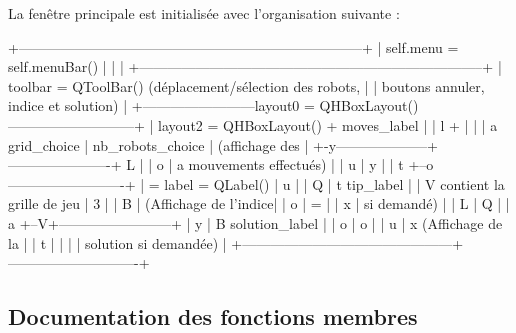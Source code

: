 \begin{DoxyVerb}La fenêtre principale est initialisée avec l'organisation suivante :

+--------------------------------------------------------------------------+
|              self.menu = self.menuBar()                                  |
|                                                                          |
+--------------------------------------------------------------------------+
|       toolbar = QToolBar()  (déplacement/sélection des robots,           |
|                     boutons annuler, indice et solution)                 |
+------------------------layout0 = QHBoxLayout()---------------------------+
|    layout2 = QHBoxLayout()                  +      moves_label           |
| l                    +                      |                            |
| a  grid_choice       |  nb_robots_choice    |     (affichage des         |
+-y--------------------+----------------------+  L                         |
| o                                           |  a  mouvements effectués)  |
| u                                           |  y                         |
| t                                           +--o-------------------------+
| =          label = QLabel()                 |  u                         |
| Q                                           |  t     tip_label           |
| V          contient la grille de jeu        |  3                         |
| B                                           |      (Affichage de l'indice|
| o                                           |  =                         |
| x                                           |      si demandé)           |
| L                                           |  Q                         |
| a                                           +--V+------------------------+
| y                                           |  B     solution_label      |
| o                                           |  o                         |
| u                                           |  x   (Affichage de la      |
| t                                           |                            |
|                                             |      solution si demandée) |
+---------------------------------------------+----------------------------+\end{DoxyVerb}
 

\subsection{Documentation des fonctions membres}
\mbox{\label{classGUIController_1_1MainWindow_acccf4f385ead7d587dfa5d201899ee2a}} 
